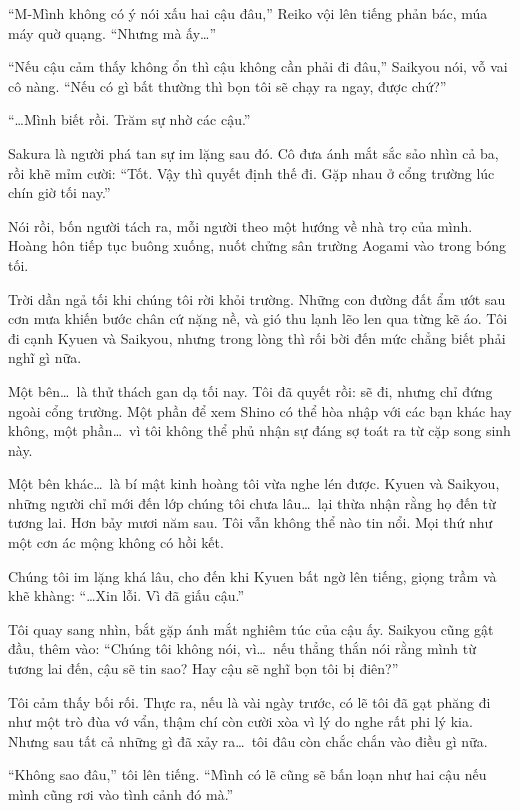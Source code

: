 \documentclass[../main.tex]{subfiles}
\begin{document}
``M-Mình không có ý nói xấu hai cậu đâu,'' Reiko vội lên tiếng phản bác, múa máy quờ quạng. ``Nhưng mà ấy\dots''

``Nếu cậu cảm thấy không ổn thì cậu không cần phải đi đâu,'' Saikyou nói, vỗ vai cô nàng. ``Nếu có gì bất thường thì bọn tôi sẽ chạy ra ngay, được chứ?''

``\dots Mình biết rồi. Trăm sự nhờ các cậu.''

Sakura là người phá tan sự im lặng sau đó. Cô đưa ánh mắt sắc sảo nhìn cả ba, rồi khẽ mỉm cười: ``Tốt. Vậy thì quyết định thế đi. Gặp nhau ở cổng trường lúc chín giờ tối nay.''

Nói rồi, bốn người tách ra, mỗi người theo một hướng về nhà trọ của mình. Hoàng hôn tiếp tục buông xuống, nuốt chửng sân trường Aogami vào trong bóng tối.


Trời dần ngả tối khi chúng tôi rời khỏi trường. Những con đường đất ẩm ướt sau cơn mưa khiến bước chân cứ nặng nề, và gió thu lạnh lẽo len qua từng kẽ áo. Tôi đi cạnh Kyuen và Saikyou, nhưng trong lòng thì rối bời đến mức chẳng biết phải nghĩ gì nữa.

Một bên\dots\ là thử thách gan dạ tối nay. Tôi đã quyết rồi: sẽ đi, nhưng chỉ đứng ngoài cổng trường. Một phần để xem Shino có thể hòa nhập với các bạn khác hay không, một phần\dots\ vì tôi không thể phủ nhận sự đáng sợ toát ra từ cặp song sinh này.

Một bên khác\dots\ là bí mật kinh hoàng tôi vừa nghe lén được. Kyuen và Saikyou, những người chỉ mới đến lớp chúng tôi chưa lâu\dots\ lại thừa nhận rằng họ đến từ tương lai. Hơn bảy mươi năm sau. Tôi vẫn không thể nào tin nổi. Mọi thứ như một cơn ác mộng không có hồi kết.

Chúng tôi im lặng khá lâu, cho đến khi Kyuen bất ngờ lên tiếng, giọng trầm và khẽ khàng: ``\dots Xin lỗi. Vì đã giấu cậu.''

Tôi quay sang nhìn, bắt gặp ánh mắt nghiêm túc của cậu ấy. Saikyou cũng gật đầu, thêm vào: ``Chúng tôi không nói, vì\dots\ nếu thẳng thắn nói rằng mình từ tương lai đến, cậu sẽ tin sao? Hay cậu sẽ nghĩ bọn tôi bị điên?''

Tôi cảm thấy bối rối. Thực ra, nếu là vài ngày trước, có lẽ tôi đã gạt phăng đi như một trò đùa vớ vẩn, thậm chí còn cười xòa vì lý do nghe rất phi lý kia. Nhưng sau tất cả những gì đã xảy ra\dots\ tôi đâu còn chắc chắn vào điều gì nữa.

``Không sao đâu,'' tôi lên tiếng. ``Mình có lẽ cũng sẽ bấn loạn như hai cậu nếu mình cũng rơi vào tình cảnh đó mà.''
\end{document}
